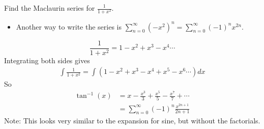 \begin{frame}
\begin{example} %
Find the Maclaurin series for $\frac{1}{1+x^2}$.
%
%
\begin{itemize}
\item<7->  Another way to write the series is $\sum_{n=0}^\infty (-x^2)^n = \sum_{n=0}^\infty (-1)^nx^{2n}$.
\end{itemize}
\end{example}
\end{frame}


\begin{frame}
\[
\frac{1}{1+x^2} = 1-x^2+x^3-x^4\cdots 
\]
\pause 
Integrating both sides gives \pause 
\begin{align*}
\int \frac{1}{1+x^2} = \int (1-x^2+x^3-x^4+x^5-x^6\cdots)dx 
\end{align*}
\pause  So
\begin{align*}
\tan^{-1}(x) & = x-\frac{x^3}{3}+\frac{x^5}{5}-\frac{x^7}{7}+\cdots\\
& = \sum_{n=0}^\infty (-1)^n\frac{x^{2n+1}}{2n+1} 
\end{align*}
\pause 
Note: This looks very similar to the expansion for sine, but without the factorials.
\end{frame}